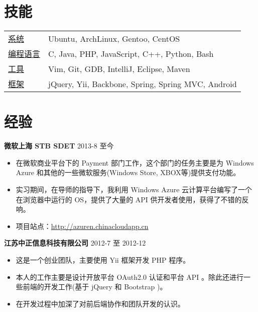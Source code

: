 ﻿\documentclass[margin]{res}
\begin{document}
 

\address{ 张启超 \\ }
\address{ 南京大学软件学院 2014届  本科 \\ (+86) 152-9838-8316  \\ \href{http://lecoding.com}{http://lecoding.com} \\ 
\href{mailto:njuzhangqichao@gmail.com}{njuzhangqichao@gmail.com} }

 
\begin{resume} 
 
\section{技能} 
   \begin{tabular}{l p{4in}}
      \underline{系统} &  Ubuntu, ArchLinux, Gentoo, CentOS \\
      \underline{编程语言} &  C, Java, PHP, JavaScript, C++, Python, Bash \\
      \underline{工具} & Vim, Git, GDB, IntelliJ, Eclipse, Maven \\
      \underline{框架} & jQuery, Yii, Backbone, Spring, Spring MVC, Android
 \end{tabular}

\section{经验} 
{\bf 微软上海 STB SDET} \hfill 2013-8 至今
\begin{itemize} \itemsep -2pt 
\item 在微软商业平台下的 Payment 部门工作，这个部门的任务主要是为 Windows Azure 和其他的一些微软服务(Windows Store, XBOX等)提供支付功能。
\item 实习期间，在导师的指导下，我利用 Windows Azure 云计算平台编写了一个在浏览器中运行的 OS，提供了大量的 API 供开发者使用，获得了不错的反响。
\item 项目站点：\href{http://azuren.chinacloudapp.cn}{http://azuren.chinacloudapp.cn}
\end{itemize}
{\bf 江苏中正信息科技有限公司} \hfill 2012-7 至 2012-12
\begin{itemize} \itemsep -2pt 
\item 这是一个创业团队，主要使用 Yii 框架开发 PHP 程序。
\item 本人的工作主要是设计开放平台 OAuth2.0 认证和平台 API 。除此还进行一些前端的开发工作(基于 jQuery 和 Bootstrap )。
\item 在开发过程中加深了对前后端协作和团队开发的认识。
\end{itemize}


\end{resume}
\end{document}
